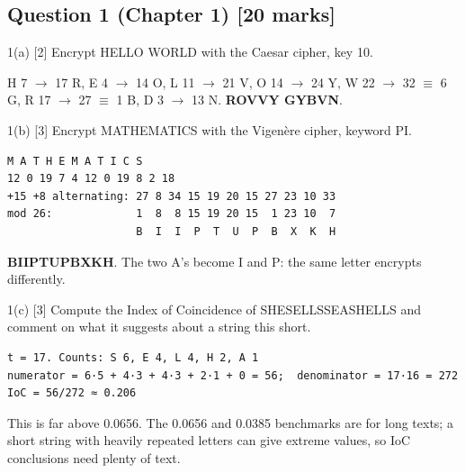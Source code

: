 \documentclass[11pt,a4paper]{article}
\begin{document}
\subsection*{Question 1 (Chapter 1) [20 marks]}
\begin{question}{1(a) \hfill\textnormal{\small [2]}}
Encrypt HELLO WORLD with the Caesar cipher, key 10.\par
\end{question}
\begin{answer}
H 7 \ensuremath{\to} 17 R, E 4 \ensuremath{\to} 14 O, L 11 \ensuremath{\to} 21 V, O 14 \ensuremath{\to} 24 Y, W 22 \ensuremath{\to} 32 \ensuremath{\equiv} 6 G, R 17 \ensuremath{\to} 27 \ensuremath{\equiv} 1 B, D 3 \ensuremath{\to} 13 N. \textbf{ROVVY GYBVN}.\par
\end{answer}
\begin{question}{1(b) \hfill\textnormal{\small [3]}}
Encrypt MATHEMATICS with the Vigenère cipher, keyword PI.\par
\end{question}
\begin{answer}
\begin{workbox}
\begin{Verbatim}[commandchars=\\\{\},fontsize=\footnotesize]
M A T H E M A T I C S
12 0 19 7 4 12 0 19 8 2 18
+15 +8 alternating: 27 8 34 15 19 20 15 27 23 10 33
mod 26:             1  8  8 15 19 20 15  1 23 10  7
                    B  I  I  P  T  U  P  B  X  K  H
\end{Verbatim}
\end{workbox}
\textbf{BIIPTUPBXKH}. The two A's become I and P: the same letter encrypts differently.\par
\end{answer}
\begin{question}{1(c) \hfill\textnormal{\small [3]}}
Compute the Index of Coincidence of SHESELLSSEASHELLS and comment on what it suggests about a string this short.\par
\end{question}
\begin{answer}
\begin{workbox}
\begin{Verbatim}[commandchars=\\\{\},fontsize=\footnotesize]
t = 17. Counts: S 6, E 4, L 4, H 2, A 1
numerator = 6·5 + 4·3 + 4·3 + 2·1 + 0 = 56;  denominator = 17·16 = 272
IoC = 56/272 ≈ 0.206
\end{Verbatim}
\end{workbox}
This is far above 0.0656. The 0.0656 and 0.0385 benchmarks are for long texts; a short string with heavily repeated letters can give extreme values, so IoC conclusions need plenty of text.\par
\end{answer}
\end{document}
